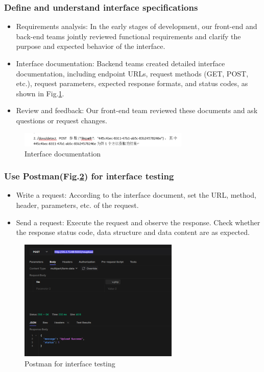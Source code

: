 \documentclass[journal]{IEEEtran}
\begin{document}
\subsubsection{Define and understand interface specifications}
\begin{itemize}
  \item Requirements analysis: In the early stages of development, our front-end and back-end teams jointly reviewed functional requirements and clarify the purpose and expected behavior of the interface.
  \item Interface documentation: Backend teams created detailed interface documentation, including endpoint URLs, request methods (GET, POST, etc.), request parameters, expected response formats, and status codes, as shown in Fig.\ref{fig:interfacespec}.
  \item Review and feedback: Our front-end team reviewed these documents and ask questions or request changes.
\end{itemize}

\begin{figure}[h]
  \centering
  \includegraphics[width=3.2in]{figures/solution-interspec.png}
  \caption{Interface documentation}
  \label{fig:interfacespec}
  \end{figure}

\subsubsection{Use Postman(Fig.\ref{fig:postman}) for interface testing}
\begin{itemize}
  \item Write a request: According to the interface document, set the URL, method, header, parameters, etc. of the request.
  \item Send a request: Execute the request and observe the response. Check whether the response status code, data structure and data content are as expected.
\end{itemize}

\begin{figure}[!t]
  \centering
  \includegraphics[width=3in]{figures/solution-postman.png}
  \caption{Postman for interface testing}
  \label{fig:postman}
  \end{figure}
\end{document}
